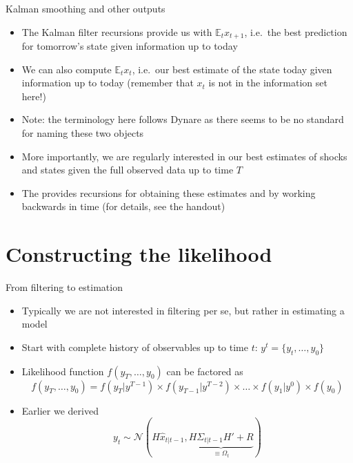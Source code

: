 \documentclass[handout,usepdftitle=false,xcolor=dvipsnames,aspectratio=169]{beamer}
\begin{document}
\begin{frame}{Kalman smoothing and other outputs}
  \begin{itemize}
    \item The Kalman filter recursions provide us with  $\mathbb{E}_t{x_{t+1}}$, i.e.\ the best prediction for tomorrow's state given information up to today\vspace{0.2cm}
    \item We can also compute  $\mathbb{E}_t{x_{t}}$, i.e.\ our best estimate of the state today given information up to today (remember that $x_t$ is not in the information set here!)\vspace{0.2cm}
    \item Note: the terminology here follows Dynare as there seems to be no standard for naming these two objects\vspace{0.2cm}
    \item More importantly, we are regularly interested in our best estimates of shocks and states given the full observed data up to time $T$\vspace{0.2cm}
    \item The  provides recursions for obtaining these estimates  and  by working backwards in time (for details, see the handout)
  \end{itemize}
\end{frame}


\section[Likelihood]{Constructing the likelihood}
\begin{frame}{From filtering to estimation}
  \begin{itemize}
    \item Typically we are not interested in filtering per se, but rather in estimating a model
    \item Start with complete history of observables up to time $t$: $y^t=\{y_t,\ldots,y_0\}$\vspace{0.2cm}
    \item Likelihood function $f\left( {{y_T},\ldots,{y_0}} \right)$ can be factored as
          \[
            f\left( {{y_T},\ldots,{y_0}} \right) = f\left( {{y_T}|{y^{T - 1}}} \right)\times f\left( {{y_{T - 1}}|{y^{T - 2}}} \right)\times \ldots \times f\left( {{y_1}|{y^0}} \right)\times f\left( {{y_0}} \right)
          \]
    \item Earlier we derived
          \[
            y_t \sim \mathcal{N}\left( H\hat x_{t|t-1},\underbrace{H{\Sigma _{t|t-1}}H' + R}_{\equiv \Omega_t} \right)
          \]

  \end{itemize}
\end{frame}
\end{document}
